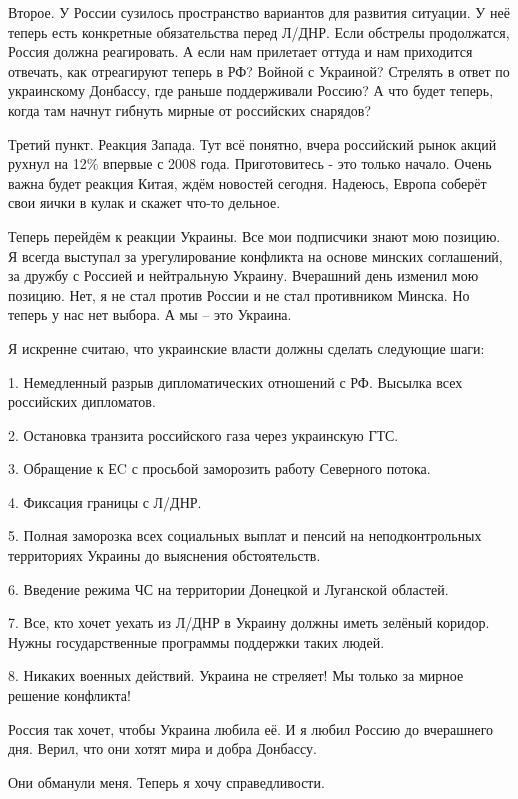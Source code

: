 Второе. У России сузилось пространство вариантов для развития ситуации. У неё
теперь есть конкретные обязательства перед Л/ДНР. Если обстрелы продолжатся,
Россия должна реагировать. А если нам прилетает оттуда и нам приходится
отвечать, как отреагируют теперь в РФ? Войной с Украиной? Стрелять в ответ по
украинскому Донбассу, где раньше поддерживали Россию? А что будет теперь, когда
там начнут гибнуть мирные от российских снарядов?

Третий пункт. Реакция Запада. Тут всё понятно, вчера российский рынок акций
рухнул на 12\% впервые с 2008 года. Приготовитесь - это только начало. Очень
важна будет реакция Китая, ждём новостей сегодня. Надеюсь, Европа соберёт свои
яички в кулак и скажет что-то дельное.

Теперь перейдём к реакции Украины. Все мои подписчики знают мою позицию. Я
всегда выступал за урегулирование конфликта на основе минских соглашений, за
дружбу с Россией и нейтральную Украину. Вчерашний день изменил мою позицию.
Нет, я не стал против России и не стал противником Минска. Но теперь у нас нет
выбора. А мы – это Украина.

Я искренне считаю, что украинские власти должны сделать следующие шаги:

1. Немедленный разрыв дипломатических отношений с РФ. Высылка всех российских
дипломатов.

2. Остановка транзита российского газа через украинскую ГТС.

3. Обращение к ЕC с просьбой заморозить работу Северного потока.

4. Фиксация границы с Л/ДНР.

5. Полная заморозка всех социальных выплат и пенсий на неподконтрольных
территориях Украины до выяснения обстоятельств.

6. Введение режима ЧС на территории Донецкой и Луганской областей.

7. Все, кто хочет уехать из Л/ДНР в Украину должны иметь зелёный коридор. Нужны
государственные программы поддержки таких людей.

8. Никаких военных действий. Украина не стреляет! Мы только за мирное решение
конфликта!

Россия так хочет, чтобы Украина любила её. И я любил Россию до вчерашнего дня.
Верил, что они хотят мира и добра Донбассу.

Они обманули меня. Теперь я хочу справедливости.

